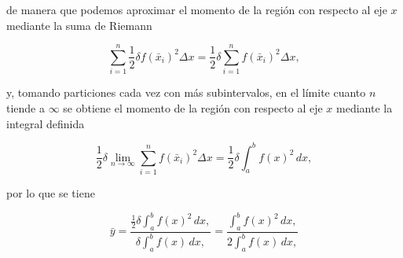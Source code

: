 \documentclass[
  a4paper,
]{scrreport}
\theoremstyle{definition}
\theoremstyle{plain}
\theoremstyle{definition}
\theoremstyle{definition}
\theoremstyle{plain}
\theoremstyle{plain}
\theoremstyle{remark}
\begin{document}
de manera que podemos aproximar el momento de la región con respecto al
eje \(x\) mediante la suma de Riemann

\[
\sum_{i=1}^n \frac{1}{2}\delta f(\bar x_i)^2\Delta x = \frac{1}{2}\delta \sum_{i=1}^n f(\bar x_i)^2\Delta x,
\]

y, tomando particiones cada vez con más subintervalos, en el límite
cuanto \(n\) tiende a \(\infty\) se obtiene el momento de la región con
respecto al eje \(x\) mediante la integral definida

\[
\frac{1}{2}\delta \lim_{n\to \infty}\sum_{i=1}^n f(\bar x_i)^2\Delta x = \frac{1}{2}\delta \int_a^b f(x)^2\, dx,
\]

por lo que se tiene

\[
\bar y = \frac{\frac{1}{2}\delta \int_a^b f(x)^2\, dx,}{\delta \int_a^b f(x)\, dx,} = \frac{\int_a^b f(x)^2\, dx,}{2\int_a^b f(x)\, dx,}
\]
\end{document}
